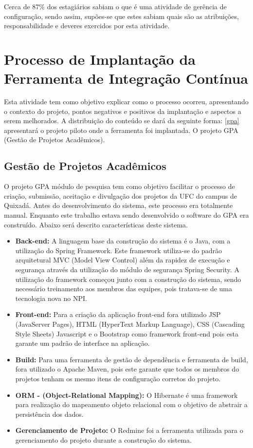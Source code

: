 Cerca de 87\% dos estagiários sabiam o que é uma atividade de gerência de configuração, sendo assim, supões-se que estes sabiam quais são as atribuições, responsabilidade e deveres exercidos por esta atividade. 

\section{Processo de Implantação da Ferramenta de Integração Contínua}\label{processoimpl}
Esta atividade tem como objetivo explicar como o processo ocorreu, apresentando o contexto do projeto, pontos negativos e positivos da implantação e aspectos a serem melhorados. A distribuição do conteúdo se dará da seguinte forma: \autoref{gpa} apresentará o projeto piloto onde a ferramenta foi implantada. O projeto GPA (Gestão de Projetos Acadêmicos).


\subsection{Gestão de Projetos Acadêmicos }\label{gpa}
O projeto GPA módulo de pesquisa tem como objetivo facilitar o processo de criação, submissão, aceitação e divulgação dos projetos da UFC do campus de Quixadá. Antes do desenvolvimento do sistema, este processo era totalmente manual. Enquanto este trabalho estava sendo desenvolvido o software do GPA era construído. Abaixo será descrito características deste sistema.

\begin{itemize}
	\item \textbf{Back-end:} A linguagem base da construção do sistema é o Java, com a utilização do Spring Framework. Este framework utiliza-se do padrão arquitetural MVC (Model View Control) além da rapidez de execução e segurança através da utilização do módulo de segurança Spring Security. A utilização do framework começou junto com a construção do sistema, sendo necessário treinamento aos membros das equipes, pois tratava-se de uma tecnologia nova no NPI.
	
	\item \textbf{Front-end:} Para a criação da aplicação front-end fora utilizado JSP (JavaServer Pages), HTML (HyperText Markup Language), CSS (Cascading Style Sheets) Javascript e o Bootstrap como framework front-end pois esta garante um padrão de interface na aplicação.
	
	\item \textbf{Build:} Para uma ferramenta de gestão de dependência e ferramenta de build, fora utilizado o Apache Maven, pois este garante que todos os membros do projetos tenham os mesmo itens de configuração corretos do projeto.
	
	\item \textbf{ORM - (Object-Relational Mapping):} O Hibernate é uma framework para realização do mapeamento objeto relacional com o objetivo de abstrair a persistência dos dados.
	
	\item \textbf{Gerenciamento de Projeto:} O Redmine foi a ferramenta utilizada para o gerenciamento do projeto durante a construção do sistema.
\end{itemize}

